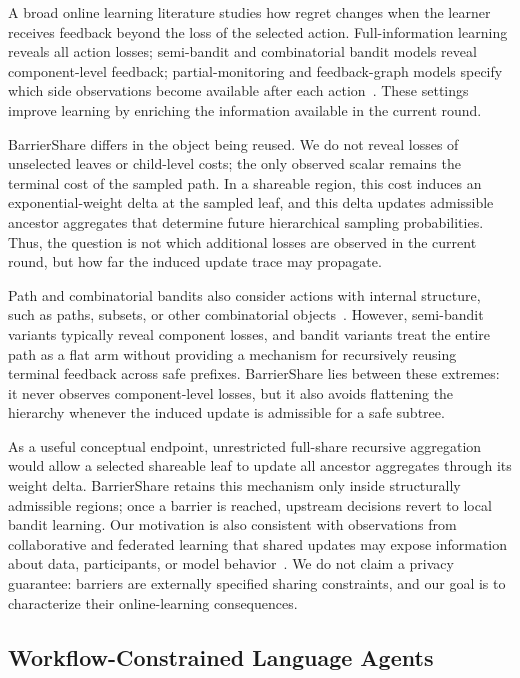 A broad online learning literature studies how regret changes when the learner receives feedback beyond the loss of the selected action.
Full-information learning reveals all action losses; semi-bandit and combinatorial bandit models reveal component-level feedback; partial-monitoring and feedback-graph models specify which side observations become available after each action~\citep{cesa2006prediction, mannor2011bandits, audibert2014regret, alon2015online}.
These settings improve learning by enriching the information available in the current round.

BarrierShare differs in the object being reused.
We do not reveal losses of unselected leaves or child-level costs; the only observed scalar remains the terminal cost of the sampled path.
In a shareable region, this cost induces an exponential-weight delta at the sampled leaf, and this delta updates admissible ancestor aggregates that determine future hierarchical sampling probabilities.
Thus, the question is not which additional losses are observed in the current round, but how far the induced update trace may propagate.

Path and combinatorial bandits also consider actions with internal structure, such as paths, subsets, or other combinatorial objects~\citep{cesa2012combinatorial, audibert2014regret}.
However, semi-bandit variants typically reveal component losses, and bandit variants treat the entire path as a flat arm without providing a mechanism for recursively reusing terminal feedback across safe prefixes.
BarrierShare lies between these extremes: it never observes component-level losses, but it also avoids flattening the hierarchy whenever the induced update is admissible for a safe subtree.

As a useful conceptual endpoint, unrestricted full-share recursive aggregation would allow a selected shareable leaf to update all ancestor aggregates through its weight delta.
BarrierShare retains this mechanism only inside structurally admissible regions; once a barrier is reached, upstream decisions revert to local bandit learning.
Our motivation is also consistent with observations from collaborative and federated learning that shared updates may expose information about data, participants, or model behavior~\citep{melis2019unintended, zhu2019deep, tramer2016stealing, sheller2020federated}.
We do not claim a privacy guarantee: barriers are externally specified sharing constraints, and our goal is to characterize their online-learning consequences.

\subsection{Workflow-Constrained Language Agents}

